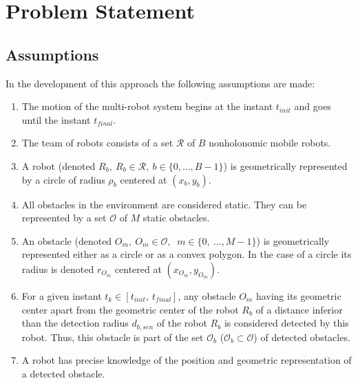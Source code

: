 \documentclass[eprint]{actapoly}
\begin{document}

\section{Problem Statement}\label{sec:problem}

\subsection{Assumptions}
In the development of this approach the following assumptions are made:

\begin{enumerate}

    \item The motion of the multi-robot system begins at
    the instant $t_{init}$ and goes until the instant $t_{final}$.

    \item The team of robots consists of a set $\mathcal{R}$ of $B$
    nonholonomic mobile robots.
    
    \item A robot (denoted $R_b,\ R_b \in \mathcal{R},\ b \in \{0,\dots,B-1\}$) is 
    geometrically represented by a circle of radius $\rho_b$ centered at $(x_b, y_b)$.
        
    \item All obstacles in the environment are considered static. They can be
    represented by a set $\mathcal{O}$ of $M$ static obstacles.
    
    \item An obstacle (denoted $O_m,\ $\mbox{$O_m \in \mathcal{O}$}$,\ $
    \mbox{$m \in \{0,\ \dots, M-1\}$}) is geometrically represented either as
    a circle or as a convex polygon. In the case of a circle its radius is
    denoted $r_{O_m}$ centered at $(x_{O_m},y_{O_m})$.
    
    \item For a given instant $t_k \in [t_{init},\ t_{final}]$, any obstacle
    $O_m$ having its geometric center apart from the geometric center of the
    robot $R_b$ of a distance inferior than the detection radius $d_{b,sen}$
    of the robot $R_b$ is considered detected by this robot.
    Thus, this obstacle is part of the set $\mathcal{O}_b$
    ($\mathcal{O}_b \subset \mathcal{O}$) of detected obstacles.
    
    \item A robot has precise knowledge of the position and geometric representation of
    a detected obstacle.
    

\end{enumerate}
\end{document}
